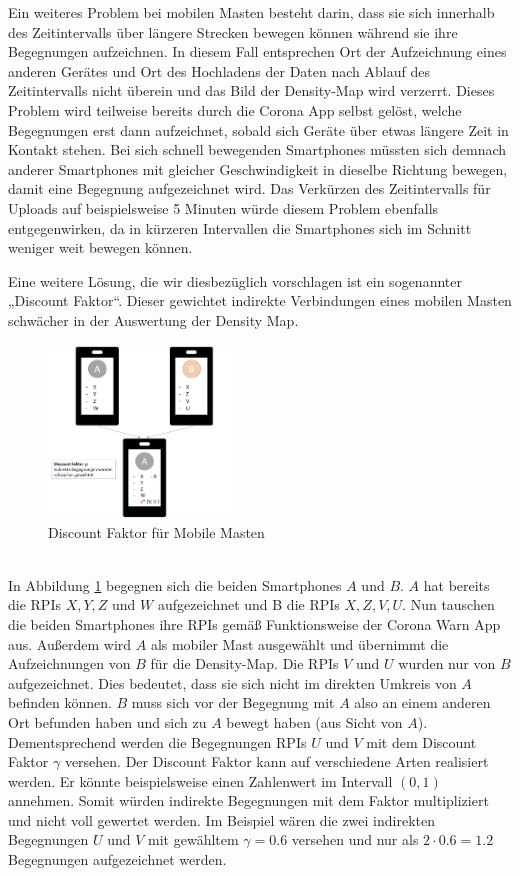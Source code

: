 \documentclass[conference,compsoc]{IEEEtran}
\begin{document}
Ein weiteres Problem bei mobilen Masten besteht darin, dass sie sich innerhalb des Zeitintervalls über längere Strecken bewegen können während sie ihre Begegnungen aufzeichnen.
In diesem Fall entsprechen Ort der Aufzeichnung eines anderen Gerätes und Ort des Hochladens der Daten nach Ablauf des Zeitintervalls nicht überein und das Bild der Density-Map wird verzerrt. 
Dieses Problem wird teilweise bereits durch die Corona App selbst gelöst, welche Begegnungen erst dann aufzeichnet, sobald sich Geräte über etwas längere Zeit in Kontakt stehen. 
Bei sich schnell bewegenden Smartphones müssten sich demnach anderer Smartphones mit gleicher Geschwindigkeit in dieselbe Richtung bewegen, damit eine Begegnung aufgezeichnet wird. 
Das Verkürzen des Zeitintervalls für Uploads auf beispielsweise 5 Minuten würde diesem Problem ebenfalls entgegenwirken, da in kürzeren Intervallen die Smartphones sich im Schnitt weniger weit bewegen können.

Eine weitere Lösung, die wir diesbezüglich vorschlagen ist ein sogenannter „Discount Faktor“. 
Dieser gewichtet indirekte Verbindungen eines mobilen Masten schwächer in der Auswertung der Density Map. \\
\begin{figure}[h]
	\centering
	\includegraphics[width=0.45\textwidth]{"Discount_Faktor"}
	\caption{Discount Faktor für Mobile Masten}
	\label{disc_factor}
\end{figure} \\
In Abbildung \ref{disc_factor} begegnen sich die beiden Smartphones $A$ und $B$. $A$ hat bereits die RPIs $X, Y, Z$ und $W$ aufgezeichnet und B die RPIs $X, Z, V, U$. 
Nun tauschen die beiden Smartphones ihre RPIs gemäß Funktionsweise der Corona Warn App aus. Außerdem wird $A$ als mobiler Mast ausgewählt und übernimmt die Aufzeichnungen von $B$ für die Density-Map.
Die RPIs $V$ und $U$ wurden nur von $B$ aufgezeichnet. Dies bedeutet, dass sie sich nicht im direkten Umkreis von $A$ befinden können. $B$ muss sich vor der Begegnung mit $A$ also an einem anderen Ort befunden haben und sich zu $A$ bewegt haben (aus Sicht von $A$).
Dementsprechend werden die Begegnungen RPIs $U$ und $V$ mit dem Discount Faktor $\gamma$ versehen.
Der Discount Faktor kann auf verschiedene Arten realisiert werden. Er könnte beispielsweise einen Zahlenwert im Intervall $(0,1)$ annehmen. 
Somit würden indirekte Begegnungen mit dem Faktor multipliziert und nicht voll gewertet werden. Im Beispiel wären die zwei indirekten Begegnungen $U$ und $V$ mit gewähltem $\gamma = 0.6$ versehen und nur als $2 \cdot 0.6 = 1.2$ Begegnungen aufgezeichnet werden.
\end{document}
